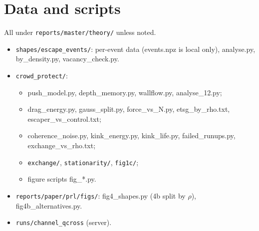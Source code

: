 \documentclass[11pt,a4paper]{article}
\begin{document}
\section{Data and scripts}
All under \texttt{reports/master/theory/} unless noted.
\begin{itemize}
\item \texttt{shapes/escape\_events/}: per-event data (events.npz is local only), analyse.py, by\_density.py, vacancy\_check.py.
\item \texttt{crowd\_protect/}:
  \begin{itemize}
  \item push\_model.py, depth\_memory.py, wallflow.py, analyse\_12.py;
  \item drag\_energy.py, gauss\_split.py, force\_vs\_N.py, etsg\_by\_rho.txt, escaper\_vs\_control.txt;
  \item coherence\_noise.py, kink\_energy.py, kink\_life.py, failed\_runups.py, exchange\_vs\_rho.txt;
  \item \texttt{exchange/}, \texttt{stationarity/}, \texttt{fig1c/};
  \item figure scripts fig\_*.py.
  \end{itemize}
\item \texttt{reports/paper/prl/figs/}: fig4\_shapes.py (4b split by $\rho$), fig4b\_alternatives.py.
\item \texttt{runs/channel\_qcross} (server).
\end{itemize}
\end{document}
